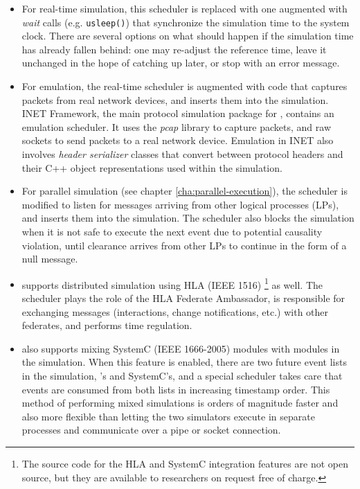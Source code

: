 \begin{itemize}
\item For real-time simulation, this scheduler is replaced with one augmented
    with \textit{wait} calls (e.g. \texttt{usleep()}) that synchronize the
    simulation time to the system clock. There are several options on what
    should happen if the simulation time has already fallen behind: one may
    re-adjust the reference time, leave it unchanged in the hope of catching up
    later, or stop with an error message.

\item For emulation, the real-time scheduler is augmented with code that captures
    packets from real network devices, and inserts them into the simulation.
    INET Framework, the main protocol simulation package for {\opp}, contains
    an emulation scheduler. It uses the \textit{pcap} library to capture
    packets, and raw sockets to send packets to a real network device.
    Emulation in INET also involves \textit{header serializer} classes that
    convert between protocol headers and their C++ object representations used
    within the simulation.

\item For parallel simulation (see chapter \ref{cha:parallel-execution}), the
    scheduler is modified to listen for messages arriving from other logical
    processes (LPs), and inserts them into the simulation. The scheduler also
    blocks the simulation when it is not safe to execute the next event due to
    potential causality violation, until clearance arrives from other LPs to
    continue in the form of a null message.

\item {\opp} supports distributed simulation using HLA (IEEE 1516) \footnote{The
    source code for the HLA and SystemC integration features are not open
    source, but they are available to researchers on request free of charge.}
    as well. The scheduler plays the role of the HLA Federate Ambassador, is
    responsible for exchanging messages (interactions, change notifications,
    etc.) with other federates, and performs time regulation.

\item {\opp} also supports mixing SystemC (IEEE 1666-2005) modules with {\opp}
    modules in the simulation. When this feature is enabled, there are two
    future event lists in the simulation, {\opp}'s and SystemC's, and a
    special scheduler takes care that events are consumed from both lists in
    increasing timestamp order. This method of performing mixed simulations is
    orders of magnitude faster and also more flexible than letting the two
    simulators execute in separate processes and communicate over a pipe or
    socket connection.
\end{itemize}

